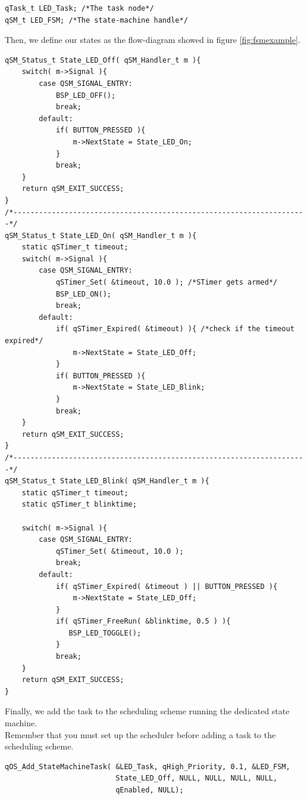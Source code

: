 \documentclass{article}
\begin{document}
\begin{lstlisting}[style=CStyle]
qTask_t LED_Task; /*The task node*/
qSM_t LED_FSM; /*The state-machine handle*/
\end{lstlisting}

Then, we define our states as the flow-diagram showed in figure \ref{fig:fsmexample}.

\begin{lstlisting}[style=CStyle]
qSM_Status_t State_LED_Off( qSM_Handler_t m ){
    switch( m->Signal ){
        case QSM_SIGNAL_ENTRY:
            BSP_LED_OFF();
            break;
        default:
            if( BUTTON_PRESSED ){
                m->NextState = State_LED_On;
            }
            break;
    }
    return qSM_EXIT_SUCCESS;
}
/*---------------------------------------------------------------------*/
qSM_Status_t State_LED_On( qSM_Handler_t m ){
    static qSTimer_t timeout;
    switch( m->Signal ){
        case QSM_SIGNAL_ENTRY:
            qSTimer_Set( &timeout, 10.0 ); /*STimer gets armed*/
            BSP_LED_ON();
            break;
        default:
            if( qSTimer_Expired( &timeout) ){ /*check if the timeout expired*/
                m->NextState = State_LED_Off;
            }
            if( BUTTON_PRESSED ){
                m->NextState = State_LED_Blink;
            }
            break;
    }
    return qSM_EXIT_SUCCESS;
}
/*---------------------------------------------------------------------*/
qSM_Status_t State_LED_Blink( qSM_Handler_t m ){
    static qSTimer_t timeout;
    static qSTimer_t blinktime;
    
    switch( m->Signal ){
        case QSM_SIGNAL_ENTRY:
            qSTimer_Set( &timeout, 10.0 );
            break;
        default:
            if( qSTimer_Expired( &timeout ) || BUTTON_PRESSED ){
                m->NextState = State_LED_Off;
            }
            if( qSTimer_FreeRun( &blinktime, 0.5 ) ){
               BSP_LED_TOGGLE();
            }
            break;
    }
    return qSM_EXIT_SUCCESS;
}
\end{lstlisting}

Finally, we add the task to the scheduling scheme running the dedicated state machine. \\

Remember that you must set up the scheduler before adding a task to the scheduling scheme. \\

\begin{lstlisting}[style=CStyle]
qOS_Add_StateMachineTask( &LED_Task, qHigh_Priority, 0.1, &LED_FSM,
                          State_LED_Off, NULL, NULL, NULL, NULL,
                          qEnabled, NULL);
\end{lstlisting}
\end{document}
